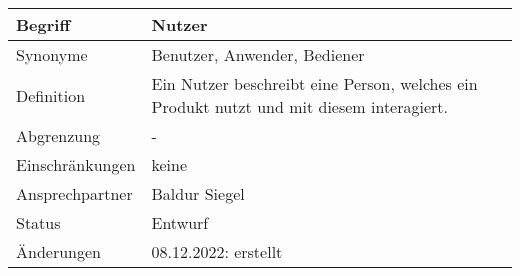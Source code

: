 \begin{table}[H]
    \centering
    \label{gls:nutzer}
    \begin{tabularx}{\textwidth}{| l | X |}
        \hline
        Begriff         & Nutzer                                                                                   \\
        \hline
        Synonyme        & Benutzer, Anwender, Bediener                                                             \\
        \hline
        Definition      & Ein Nutzer beschreibt eine Person, welches ein Produkt nutzt und mit diesem interagiert. \\
        \hline
        Abgrenzung      & -                                                                                        \\
        \hline
        Einschränkungen & keine                                                                                    \\
        \hline
        Ansprechpartner & Baldur Siegel                                                                            \\
        \hline
        Status          & Entwurf                                                                                  \\
        \hline
        Änderungen      & 08.12.2022: erstellt                                                                     \\
        \hline
    \end{tabularx}
\end{table}

